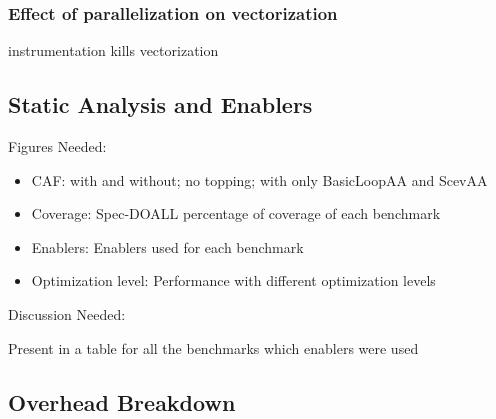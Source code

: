 \subsubsection{Effect of parallelization on vectorization}

instrumentation kills vectorization


\subsection{Static Analysis and Enablers}
Figures Needed:
\begin{itemize}
\item CAF: with and without; no topping; with only BasicLoopAA and ScevAA
\item Coverage: Spec-DOALL percentage of coverage of each benchmark
\item Enablers: Enablers used for each benchmark
\item Optimization level: Performance with different optimization levels
\end{itemize}

Discussion Needed:

Present in a table for all the benchmarks which enablers were used

\subsection{Overhead Breakdown}

